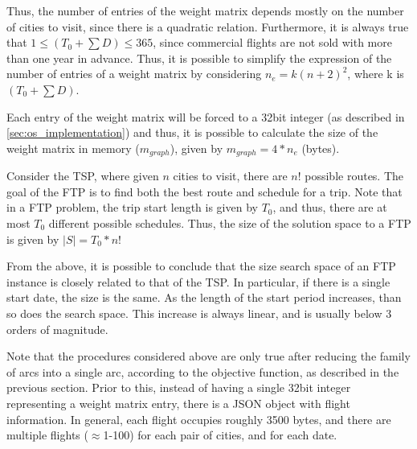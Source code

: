 Thus, the number of entries of the weight matrix depends mostly on the number of cities to visit, since there is a quadratic relation. Furthermore, it is always true that $1 \leq (T_{0} + \sum D) \leq 365$, since commercial flights are not sold with more than one year in advance. Thus, it is possible to simplify the expression of the number of entries of a weight matrix by considering $n_{e} = k(n+2)^2$, where k is 
$(T_{0} + \sum D)$.

Each entry of the weight matrix will be forced to a 32bit integer (as described in \ref{sec:os_implementation}) and thus, it is possible to calculate the size of the weight matrix in memory ($m_{graph}$), given by $m_{graph} = 4*n_e$ (bytes). 


Consider the TSP, where given $n$ cities to visit, there are $n!$ possible routes. The goal of the FTP is to find both the best route and schedule for a trip. Note that in a FTP problem, the trip start length is given by $T_{0}$, and thus, there are at most $T_{0}$ different possible schedules. Thus, the size of the solution space to a FTP is given by $|S| = T_{0}*n!$  

From the above, it is possible to conclude that the size search space of an FTP instance is closely related to that of the TSP. In particular, if there is a single start date, the size is the same. As the length of the start period increases, than so does the search space. This increase is always linear, and is usually below 3 orders of magnitude. 

Note that the procedures considered above are only true after reducing the family of arcs into a single arc, according to the objective function, as described in the previous section. Prior to this, instead of having a single 32bit integer representing a weight matrix entry, there is a JSON object with flight information. In general, each flight occupies roughly 3500 bytes, and there are multiple flights ($\approx$1-100) for each pair of cities, and for each date. 






